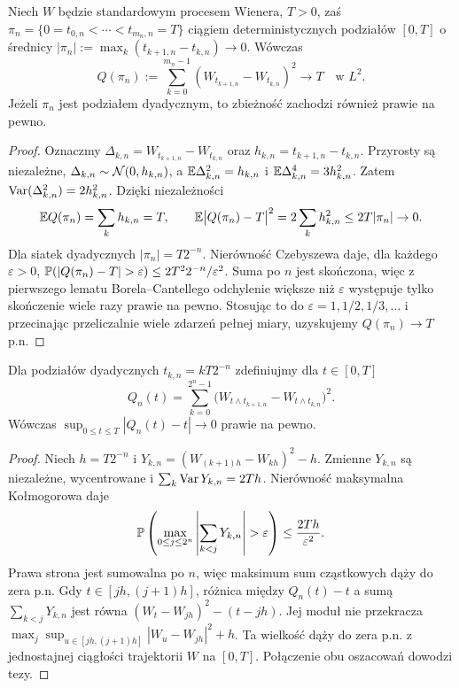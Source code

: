 \begin{twierdzenie}
Niech $W$ będzie standardowym procesem Wienera, $T>0$, zaś
$\pi_n=\{0=t_{0,n}<\cdots<t_{m_n,n}=T\}$
ciągiem deterministycznych podziałów $[0,T]$ o średnicy
$|\pi_n|:=\max_k(t_{k+1,n}-t_{k,n})\to0$.
Wówczas
\[
Q(\pi_n):=\sum_{k=0}^{m_n-1}
(W_{t_{k+1,n}}-W_{t_{k,n}})^2
\longrightarrow T\quad\text{w }L^2.
\]
Jeżeli $\pi_n$ jest podziałem dyadycznym, to zbieżność
zachodzi również prawie na pewno.
\end{twierdzenie}
\begin{proof}
Oznaczmy $\Delta_{k,n}=W_{t_{k+1,n}}-W_{t_{k,n}}$
oraz $h_{k,n}=t_{k+1,n}-t_{k,n}$.
Przyrosty są niezależne, $\Delta_{k,n}\sim\mathcal{N}(0,h_{k,n})$,
a $\mathbb{E}\Delta_{k,n}^2=h_{k,n}$ i
$\mathbb{E}\Delta_{k,n}^4=3h_{k,n}^2$. Zatem
$\operatorname{Var}(\Delta_{k,n}^2)=2h_{k,n}^2$.
Dzięki niezależności
\[
\mathbb{E} Q(\pi_n)=\sum_k h_{k,n}=T,
\qquad
\mathbb{E}\bigl|Q(\pi_n)-T\bigr|^2
=2\sum_k h_{k,n}^2\le 2T|\pi_n|\to0.
\]
Dla siatek dyadycznych $|\pi_n|=T2^{-n}$.
Nierówność Czebyszewa daje, dla każdego $\varepsilon>0$,
$\Prob(|Q(\pi_n)-T|>\varepsilon)
\le 2T^2 2^{-n}/\varepsilon^2$.
Suma po $n$ jest skończona, więc z pierwszego lematu
Borela--Cantellego odchylenie większe niż $\varepsilon$
występuje tylko skończenie wiele razy prawie na pewno.
Stosując to do $\varepsilon=1,1/2,1/3,\ldots$
i przecinając przeliczalnie wiele zdarzeń pełnej miary,
uzyskujemy $Q(\pi_n)\to T$ p.n.
\end{proof}

\begin{wniosek}
Dla podziałów dyadycznych $t_{k,n}=kT2^{-n}$
zdefiniujmy dla $t\in[0,T]$
\[
Q_n(t)=\sum_{k=0}^{2^n-1}
\bigl(W_{t\wedge t_{k+1,n}}-W_{t\wedge t_{k,n}}\bigr)^2.
\]
Wówczas $\sup_{0\le t\le T}|Q_n(t)-t|\to0$
prawie na pewno.
\end{wniosek}
\begin{proof}
Niech $h=T2^{-n}$ i
$Y_{k,n}=(W_{(k+1)h}-W_{kh})^2-h$.
Zmienne $Y_{k,n}$ są niezależne, wycentrowane i
$\sum_k\operatorname{Var} Y_{k,n}=2Th$.
Nierówność maksymalna Kołmogorowa daje
\[
\Prob\left(\max_{0\le j\le 2^n}
\left|\sum_{k<j}Y_{k,n}\right|>\varepsilon\right)
\le \frac{2Th}{\varepsilon^2}.
\]
Prawa strona jest sumowalna po $n$, więc maksimum
sum cząstkowych dąży do zera p.n. Gdy
$t\in[jh,(j+1)h]$, różnica między $Q_n(t)-t$
a sumą $\sum_{k<j}Y_{k,n}$ jest równa
$(W_t-W_{jh})^2-(t-jh)$. Jej moduł nie przekracza
$\max_j\sup_{u\in[jh,(j+1)h]}|W_u-W_{jh}|^2+h$.
Ta wielkość dąży do zera p.n. z jednostajnej
ciągłości trajektorii $W$ na $[0,T]$.
Połączenie obu oszacowań dowodzi tezy.
\end{proof}

